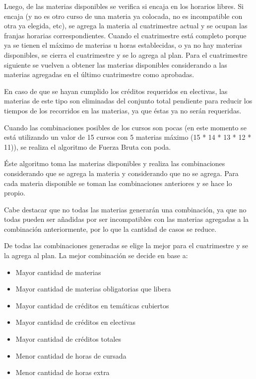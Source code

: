 \documentclass[a4paper]{article}
\begin{document}
Luego, de las materias disponibles se verifica si encaja en los horarios libres. Si encaja (y no es otro curso de una materia ya colocada, no es incompatible con otra ya elegida, etc), se agrega la materia al cuatrimestre actual y se ocupan las franjas horarias correspondientes. Cuando el cuatrimestre está completo porque ya se tienen el máximo de materias u horas establecidas, o ya no hay materias disponibles, se cierra el cuatrimestre y se lo agrega al plan. Para el cuatrimestre siguiente se vuelven a obtener las materias disponibles considerando a las materias agregadas en el último cuatrimestre como aprobadas.

En caso de que se hayan cumplido los créditos requeridos en electivas, las materias de este tipo son eliminadas del conjunto total pendiente para reducir los tiempos de los recorridos en las materias, ya que éstas ya no serán requeridas.

Cuando las combinaciones posibles de los cursos son pocas (en este momento se está utilizando un valor de 15 cursos con 5 materias máximo (15 * 14 * 13 * 12 * 11)), se realiza el algoritmo de Fuerza Bruta con poda.

Éste algoritmo toma las materias disponibles y realiza las combinaciones considerando que se agrega la materia y considerando que no se agrega. Para cada materia disponible se toman las combinaciones anteriores y se hace lo propio.

Cabe destacar que no todas las materias generarán una combinación, ya que no todas pueden ser añadidas por ser incompatibles con las materias agregadas a la combinación anteriormente, por lo que la cantidad de casos se reduce.

De todas las combinaciones generadas se elige la mejor para el cuatrimestre y se la agrega al plan. La mejor combinación se decide en base a:

\begin{itemize}
	\item Mayor cantidad de materias
	\item Mayor cantidad de materias obligatorias que libera
	\item Mayor cantidad de créditos en temáticas cubiertos
	\item Mayor cantidad de créditos en electivas
	\item Mayor cantidad de créditos totales
	\item Menor cantidad de horas de cursada
	\item Menor cantidad de horas extra
\end{itemize}
\end{document}
